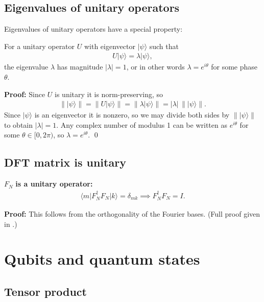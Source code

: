 \documentclass[11pt]{article}
\begin{document}
\subsection{Eigenvalues of unitary operators}

Eigenvalues of unitary operators have a special property:

For a unitary operator $U$ with eigenvector $\vert \psi \rangle$ such that
\begin{align*}
U \vert \psi \rangle = \lambda \vert \psi \rangle,
\end{align*}
the eigenvalue $\lambda$ has magnitude $|\lambda| = 1$, or in other words $\lambda = e^{i\theta}$ for some phase $\theta$.

\textbf{Proof:} Since $U$ is unitary it is norm-preserving, so
\begin{align*}
\|\vert\psi\rangle\| = \|U\vert\psi\rangle\| = \|\lambda\vert\psi\rangle\| = |\lambda|\,\|\vert\psi\rangle\|.
\end{align*}
Since $\vert\psi\rangle$ is an eigenvector it is nonzero, so we may divide both sides by $\|\vert\psi\rangle\|$ to obtain $|\lambda| = 1$. Any complex number of modulus 1 can be written as $e^{i\theta}$ for some $\theta \in [0, 2\pi)$, so $\lambda = e^{i\theta}$. \qed

\subsection{DFT matrix is unitary}

$F_N$ \textbf{is a unitary operator:}
\begin{align*}
\langle m \vert F_N^\dagger F_N \vert k \rangle = \delta_{mk}
\implies F_N^\dagger F_N = I.
\end{align*}

\textbf{Proof:} This follows from the orthogonality of the Fourier bases. (Full proof given in \cite{Barros_2026}.)

\section{Qubits and quantum states}

\subsection{Tensor product}
\end{document}
